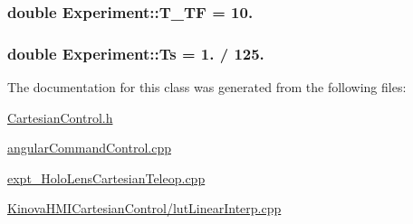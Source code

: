 \subsubsection[{\texorpdfstring{T\+\_\+\+TF}{T_TF}}]{\setlength{\rightskip}{0pt plus 5cm}double Experiment\+::\+T\+\_\+\+TF = 10.}\hypertarget{classExperiment_ae4044c67ccebf1fd2370d304c2b6e6a6}{}\label{classExperiment_ae4044c67ccebf1fd2370d304c2b6e6a6}
\subsubsection[{\texorpdfstring{Ts}{Ts}}]{\setlength{\rightskip}{0pt plus 5cm}double Experiment\+::\+Ts = 1. / 125.}\hypertarget{classExperiment_ac51084a578b7edb7fa68f96d98671609}{}\label{classExperiment_ac51084a578b7edb7fa68f96d98671609}


The documentation for this class was generated from the following files\+:\begin{DoxyCompactItemize}
\item 
\hyperlink{CartesianControl_8h}{Cartesian\+Control.\+h}\item 
\hyperlink{angularCommandControl_8cpp}{angular\+Command\+Control.\+cpp}\item 
\hyperlink{expt__HoloLensCartesianTeleop_8cpp}{expt\+\_\+\+Holo\+Lens\+Cartesian\+Teleop.\+cpp}\item 
\hyperlink{KinovaHMICartesianControl_2lutLinearInterp_8cpp}{Kinova\+H\+M\+I\+Cartesian\+Control/lut\+Linear\+Interp.\+cpp}\end{DoxyCompactItemize}
